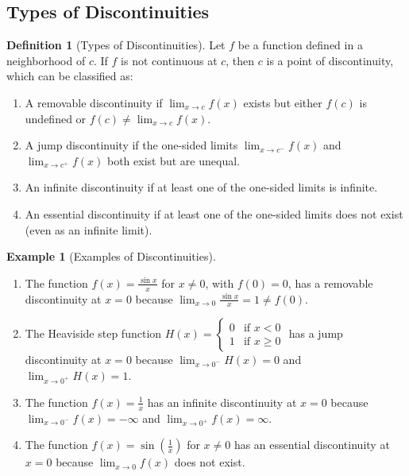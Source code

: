 \documentclass[12pt,a4paper]{article}
\theoremstyle{plain}
\theoremstyle{definition}
\newtheorem{definition}[theorem]{Definition}
\newtheorem{example}[theorem]{Example}
\begin{document}
\subsection{Types of Discontinuities}

\begin{definition}[Types of Discontinuities]
Let $f$ be a function defined in a neighborhood of $c$. If $f$ is not continuous at $c$, then $c$ is a point of discontinuity, which can be classified as:
\begin{enumerate}[label=(\roman*)]
\item A removable discontinuity if $\lim_{x \to c} f(x)$ exists but either $f(c)$ is undefined or $f(c) \neq \lim_{x \to c} f(x)$.
\item A jump discontinuity if the one-sided limits $\lim_{x \to c^-} f(x)$ and $\lim_{x \to c^+} f(x)$ both exist but are unequal.
\item An infinite discontinuity if at least one of the one-sided limits is infinite.
\item An essential discontinuity if at least one of the one-sided limits does not exist (even as an infinite limit).
\end{enumerate}
\end{definition}

\begin{example}[Examples of Discontinuities]
\begin{enumerate}[label=(\alph*)]
\item The function $f(x) = \frac{\sin x}{x}$ for $x \neq 0$, with $f(0) = 0$, has a removable discontinuity at $x = 0$ because $\lim_{x \to 0} \frac{\sin x}{x} = 1 \neq f(0)$.
\item The Heaviside step function $H(x) = \begin{cases} 0 & \text{if } x < 0 \\ 1 & \text{if } x \geq 0 \end{cases}$ has a jump discontinuity at $x = 0$ because $\lim_{x \to 0^-} H(x) = 0$ and $\lim_{x \to 0^+} H(x) = 1$.
\item The function $f(x) = \frac{1}{x}$ has an infinite discontinuity at $x = 0$ because $\lim_{x \to 0^-} f(x) = -\infty$ and $\lim_{x \to 0^+} f(x) = \infty$.
\item The function $f(x) = \sin\left(\frac{1}{x}\right)$ for $x \neq 0$ has an essential discontinuity at $x = 0$ because $\lim_{x \to 0} f(x)$ does not exist.
\end{enumerate}
\end{example}
\end{document}
